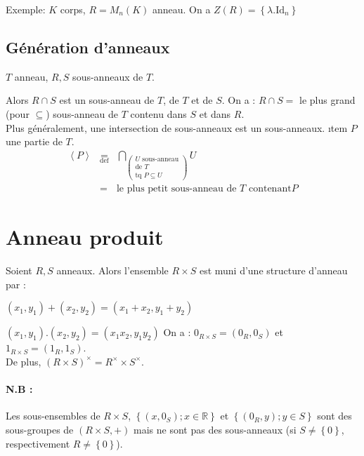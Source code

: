 \documentclass[reqno,a4paper,10pt]{report}
\makeatletter
\newcommand{\gen}[1]{\left\langle #1 \right\rangle} %
\newcommand{\set}[1]{\left\lbrace #1 \right\rbrace} %
\newcommand{\IR}{\ensuremath{\mathbb{R}}\xspace} %
\newcommand{\id}{\ensuremath{\mathrm{Id}}} %
\newcommand{\tdef}[1]{\underset{\text{def}}{ #1 }}
\let\olditemize=\itemize%
\renewenvironment{itemize}{%
    \olditemize%
  }{%
    \@noparlisttrue%
    \endlist%
  }%
\makeatother
\begin{document}
Exemple: $K$ corps, $R=M_n(K)$ anneau. On a $Z(R)=\set{\lambda . \id_n}$

\subsection{Génération d'anneaux}
$T$ anneau, $R,S$ sous-anneaux de $T$.
\begin{itemize}
  \item Alors $R \cap S$ est un sous-anneau de $T$, de $T$ et de $S$.
    On a : $R \cap S =$ le plus grand (pour $\subseteq$) sous-anneau de $T$
    contenu dans $S$ et dans $R$.\\
    Plus généralement, une intersection de sous-anneaux est un sous-anneaux.
  \i tem $P$ une partie de $T$.
    \begin{eqnarray*}
      \gen{P} &\tdef{=}&\bigcap_{
      \left(\begin{array}{c}
        U\text{ sous-anneau}\\
        \text{de } T\\
        \text{tq }P \subseteq U
      \end{array}\right)} U\\
      &=&\text{le plus petit sous-anneau de } T \text{ contenant} P
    \end{eqnarray*}
\end{itemize}

\section{Anneau produit}
Soient $R,S$ anneaux. Alors l'ensemble $R\times S$ est muni d'une structure
d'anneau par :
\begin{itemize}
  \item $(x_1, y_1)+(x_2, y_2) = (x_1+x_2, y_1+y_2)$
  \item $(x_1, y_1).(x_2, y_2) = (x_1x_2, y_1y_2)$
\end{itemize}
On a : $0_{R\times S}=(0_R, 0_S)$ et $1_{R\times S}=(1_R, 1_S)$.\\
De plus, $(R\times S)^\times = R^\times\times S^\times$.
\paragraph{N.B :}
Les sous-ensembles de $R\times S$, $\set{(x,0_S); x \in \IR}$ et $\set{(0_R,
y); y \in S}$ sont des sous-groupes de $(R\times S, +)$ mais ne sont pas
des sous-anneaux (si $S \neq \set{0}$, respectivement $R \neq \set{0}$).
\end{document}
